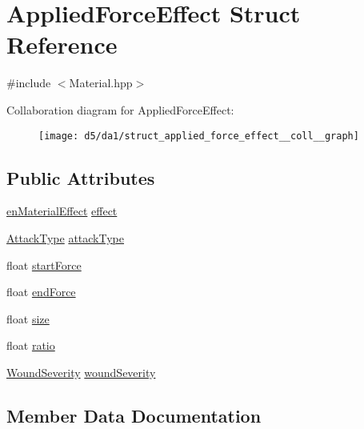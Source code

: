 \hypertarget{struct_applied_force_effect}{}\section{Applied\+Force\+Effect Struct Reference}
\label{struct_applied_force_effect}


{\ttfamily \#include $<$Material.\+hpp$>$}



Collaboration diagram for Applied\+Force\+Effect\+:\nopagebreak
\begin{figure}[H]
\begin{center}
\leavevmode
\texttt{[image: d5/da1/struct\_applied\_force\_effect\_\_coll\_\_graph]}
\end{center}
\end{figure}
\subsection*{Public Attributes}
\begin{DoxyCompactItemize}
\item 
\mbox{\hyperlink{_material_8hpp_a666cff003097e3165d55b4b1c269a2e6}{en\+Material\+Effect}} \mbox{\hyperlink{struct_applied_force_effect_aa78faf3596c6557107dcd902b0397811}{effect}}
\item 
\mbox{\hyperlink{_enum_types_8hpp_a904b2f9c8f3951116c343784c59d6afe}{Attack\+Type}} \mbox{\hyperlink{struct_applied_force_effect_abf55a5ab31b65c1b6781a863ef7c3b75}{attack\+Type}}
\item 
float \mbox{\hyperlink{struct_applied_force_effect_a041935c570639c9f1f87e34e114f204e}{start\+Force}}
\item 
float \mbox{\hyperlink{struct_applied_force_effect_a59d301bbc9070156ed39cf672b2724bf}{end\+Force}}
\item 
float \mbox{\hyperlink{struct_applied_force_effect_aa50dc7f47801c66dc9df54d8fb281cf0}{size}}
\item 
float \mbox{\hyperlink{struct_applied_force_effect_a01ede7323a840f3f44bc9200e9b8e8f9}{ratio}}
\item 
\mbox{\hyperlink{_enum_types_8hpp_a295be2e2d0f307f31ad832b24a7736c6}{Wound\+Severity}} \mbox{\hyperlink{struct_applied_force_effect_a5aa8b89ec11b997955d4160b3fb671ec}{wound\+Severity}}
\end{DoxyCompactItemize}


\subsection{Member Data Documentation}
\mbox{\label{struct_applied_force_effect_abf55a5ab31b65c1b6781a863ef7c3b75}} 
